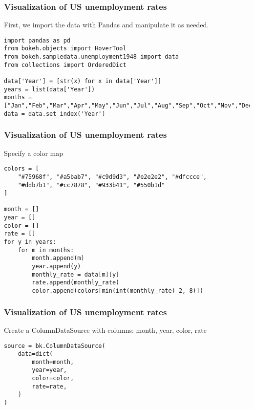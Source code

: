 \begin{frame}[fragile] \frametitle{Visualization of US unemployment rates}
First, we import the data with Pandas and manipulate it as needed.
\begin{lstlisting}
import pandas as pd
from bokeh.objects import HoverTool
from bokeh.sampledata.unemployment1948 import data
from collections import OrderedDict

data['Year'] = [str(x) for x in data['Year']]
years = list(data['Year'])
months = ["Jan","Feb","Mar","Apr","May","Jun","Jul","Aug","Sep","Oct","Nov","Dec"]
data = data.set_index('Year')
\end{lstlisting}

\end{frame}

\begin{frame}[fragile] \frametitle{Visualization of US unemployment rates}
Specify a color map
\begin{lstlisting}
colors = [
    "#75968f", "#a5bab7", "#c9d9d3", "#e2e2e2", "#dfccce",
    "#ddb7b1", "#cc7878", "#933b41", "#550b1d"
]

month = []
year = []
color = []
rate = []
for y in years:
    for m in months:
        month.append(m)
        year.append(y)
        monthly_rate = data[m][y]
        rate.append(monthly_rate)
        color.append(colors[min(int(monthly_rate)-2, 8)])
\end{lstlisting}

\end{frame}

\begin{frame}[fragile] \frametitle{Visualization of US unemployment rates}
Create a ColumnDataSource with columns: month, year, color, rate
\begin{lstlisting}
source = bk.ColumnDataSource(
    data=dict(
        month=month,
        year=year,
        color=color,
        rate=rate,
    )
)

\end{lstlisting}

\end{frame}

